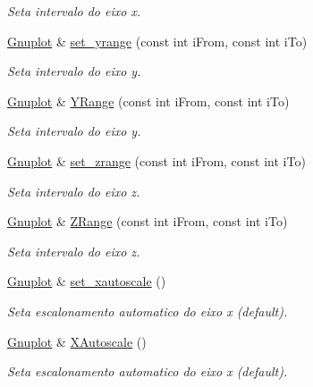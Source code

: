 \begin{DoxyCompactItemize}
\begin{DoxyCompactList}\small\item\em Seta intervalo do eixo x. \end{DoxyCompactList}\item 
\hyperlink{class_gnuplot}{Gnuplot} \& \hyperlink{class_gnuplot_af621a43664a07523f098ffc3fb5a99b0}{set\+\_\+yrange} (const int i\+From, const int i\+To)
\begin{DoxyCompactList}\small\item\em Seta intervalo do eixo y. \end{DoxyCompactList}\item 
\hyperlink{class_gnuplot}{Gnuplot} \& \hyperlink{class_gnuplot_a266411505d17e3f85ceebd252b9e5fe9}{Y\+Range} (const int i\+From, const int i\+To)
\begin{DoxyCompactList}\small\item\em Seta intervalo do eixo y. \end{DoxyCompactList}\item 
\hyperlink{class_gnuplot}{Gnuplot} \& \hyperlink{class_gnuplot_a91666451b8cfd1c5b279d2e585b11af6}{set\+\_\+zrange} (const int i\+From, const int i\+To)
\begin{DoxyCompactList}\small\item\em Seta intervalo do eixo z. \end{DoxyCompactList}\item 
\hyperlink{class_gnuplot}{Gnuplot} \& \hyperlink{class_gnuplot_a8331c7ee5d65be5f4d88922a0b2f5d35}{Z\+Range} (const int i\+From, const int i\+To)
\begin{DoxyCompactList}\small\item\em Seta intervalo do eixo z. \end{DoxyCompactList}\item 
\hyperlink{class_gnuplot}{Gnuplot} \& \hyperlink{class_gnuplot_a453688dc2eb979f842082290f3c02ac3}{set\+\_\+xautoscale} ()
\begin{DoxyCompactList}\small\item\em Seta escalonamento automatico do eixo x (default). \end{DoxyCompactList}\item 
\hyperlink{class_gnuplot}{Gnuplot} \& \hyperlink{class_gnuplot_a4260baaa8fa1c269dd6eec31dcada605}{X\+Autoscale} ()
\begin{DoxyCompactList}\small\item\em Seta escalonamento automatico do eixo x (default). \end{DoxyCompactList}\item 

\end{DoxyCompactItemize}
